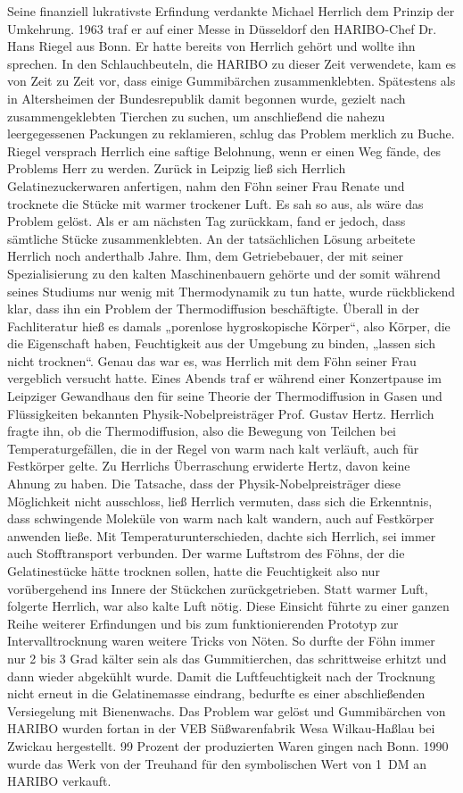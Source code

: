 \documentclass[11pt,a4paper]{article}
\begin{document}
Seine finanziell lukrativste Erfindung verdankte Michael Herrlich dem Prinzip
der Umkehrung. 1963 traf er auf einer Messe in Düsseldorf den HARIBO-Chef
Dr. Hans Riegel aus Bonn. Er hatte bereits von Herrlich gehört und wollte ihn
sprechen. In den Schlauchbeuteln, die HARIBO zu dieser Zeit verwendete, kam es
von Zeit zu Zeit vor, dass einige Gummibärchen zusammenklebten. Spätestens als
in Altersheimen der Bundesrepublik damit begonnen wurde, gezielt nach
zusammengeklebten Tierchen zu suchen, um anschließend die nahezu
leergegessenen Packungen zu reklamieren, schlug das Problem merklich zu Buche.
Riegel versprach Herrlich eine saftige Belohnung, wenn er einen Weg fände, des
Problems Herr zu werden. Zurück in Leipzig ließ sich Herrlich
Gelatinezuckerwaren anfertigen, nahm den Föhn seiner Frau Renate und trocknete
die Stücke mit warmer trockener Luft. Es sah so aus, als wäre das Problem
gelöst. Als er am nächsten Tag zurückkam, fand er jedoch, dass sämtliche
Stücke zusammenklebten. An der tatsächlichen Lösung arbeitete Herrlich noch
anderthalb Jahre. Ihm, dem Getriebebauer, der mit seiner Spezialisierung zu
den kalten Maschinenbauern gehörte und der somit während seines Studiums nur
wenig mit Thermodynamik zu tun hatte, wurde rückblickend klar, dass ihn ein
Problem der Thermodiffusion beschäftigte. Überall in der Fachliteratur hieß es
damals „porenlose hygroskopische Körper“, also Körper, die die Eigenschaft
haben, Feuchtigkeit aus der Umgebung zu binden, „lassen sich nicht
trocknen“. Genau das war es, was Herrlich mit dem Föhn seiner Frau vergeblich
versucht hatte. Eines Abends traf er während einer Konzertpause im Leipziger
Gewandhaus den für seine Theorie der Thermodiffusion in Gasen und
Flüssigkeiten bekannten Physik-Nobelpreisträger Prof. Gustav Hertz. Herrlich
fragte ihn, ob die Thermodiffusion, also die Bewegung von Teilchen bei
Temperaturgefällen, die in der Regel von warm nach kalt verläuft, auch für
Festkörper gelte. Zu Herrlichs Überraschung erwiderte Hertz, davon keine
Ahnung zu haben. Die Tatsache, dass der Physik-Nobelpreisträger diese
Möglichkeit nicht ausschloss, ließ Herrlich vermuten, dass sich die
Erkenntnis, dass schwingende Moleküle von warm nach kalt wandern, auch auf
Festkörper anwenden ließe. Mit Temperaturunterschieden, dachte sich Herrlich,
sei immer auch Stofftransport verbunden. Der warme Luftstrom des Föhns, der
die Gelatinestücke hätte trocknen sollen, hatte die Feuchtigkeit also nur
vorübergehend ins Innere der Stückchen zurückgetrieben.  Statt warmer Luft,
folgerte Herrlich, war also kalte Luft nötig. Diese Einsicht führte zu einer
ganzen Reihe weiterer Erfindungen und bis zum funktionierenden Prototyp zur
Intervalltrocknung waren weitere Tricks von Nöten. So durfte der Föhn immer
nur 2 bis 3 Grad kälter sein als das Gummitierchen, das schrittweise erhitzt
und dann wieder abgekühlt wurde. Damit die Luftfeuchtigkeit nach der Trocknung
nicht erneut in die Gelatinemasse eindrang, bedurfte es einer abschließenden
Versiegelung mit Bienenwachs. Das Problem war gelöst und Gummibärchen von
HARIBO wurden fortan in der VEB Süßwarenfabrik Wesa Wilkau-Haßlau bei Zwickau
hergestellt. 99 Prozent der produzierten Waren gingen nach Bonn. 1990 wurde
das Werk von der Treuhand für den symbolischen Wert von 1~DM an HARIBO
verkauft.
\end{document}
